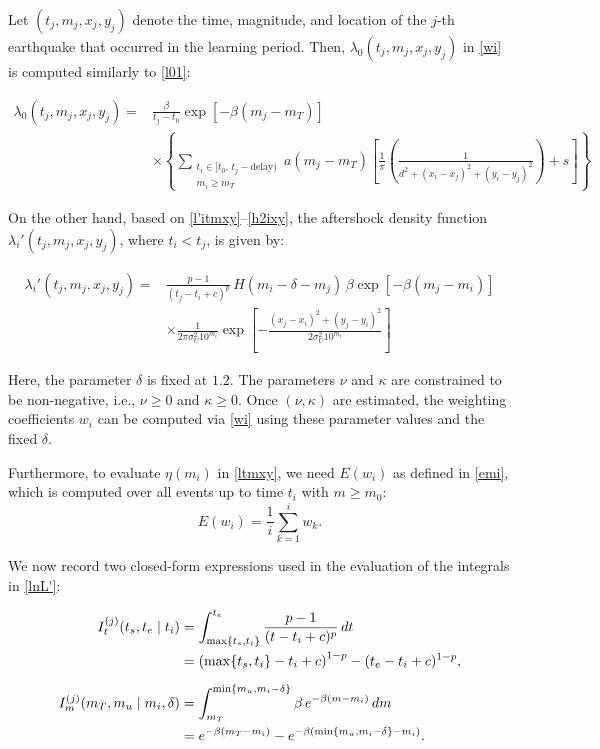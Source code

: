 \documentclass[linenum,doublespace,onecolumn]{SSA-SRL}
\theoremstyle{lemma}
\begin{document}
Let $(t_j, m_j, x_j, y_j)$ denote the time, magnitude, and location of the $j$-th earthquake that occurred in the learning period. Then, $\lambda_0(t_j, m_j, x_j, y_j)$ in \eqref{wi} is computed similarly to \eqref{l01}:

\begin{equation}\label{l20}
\begin{aligned}
\lambda_0(t_j, m_j, x_j, y_j) = &\frac{\beta}{t_j - t_0} \exp\!\left[-\beta(m_j - m_T)\right] \\
&\times \left\{ \sum_{\substack{t_i \in [t_0,\,t_j - \text{delay}) \\ m_i \ge m_T}} 
a(m_j - m_T) \left[ \frac{1}{\pi} \left( \frac{1}{d^2 + (x_i - x_j)^2 + (y_i - y_j)^2} \right) + s \right] \right\}
\end{aligned}
\end{equation}

On the other hand, based on \eqref{l'itmxy}--\eqref{h2ixy}, the aftershock density function $\lambda_i'(t_j, m_j, x_j, y_j)$, where $t_i < t_j$, is given by:

\begin{equation*}
\begin{aligned}
\lambda_i'(t_j, m_j, x_j, y_j) = &\frac{p - 1}{(t_j - t_i + c)^p} \, H(m_i - \delta - m_j)\, \beta \exp\!\left[ -\beta(m_j - m_i) \right] \\
&\times \frac{1}{2\pi \sigma_U^2 10^{m_i}} \exp\!\left[ -\frac{(x_j - x_i)^2 + (y_j - y_i)^2}{2 \sigma_U^2 10^{m_i}} \right]
\end{aligned}
\end{equation*}

Here, the parameter $\delta$ is fixed at $1.2$. The parameters $\nu$ and $\kappa$ are constrained to be non-negative, i.e., $\nu \ge 0$ and $\kappa \ge 0$. Once $(\nu, \kappa)$ are estimated, the weighting coefficients $w_i$ can be computed via \eqref{wi} using these parameter values and the fixed $\delta$.

Furthermore, to evaluate $\eta(m_i)$ in \eqref{ltmxy}, we need $E(w_i)$ as defined in \eqref{emi}, which is computed over all events up to time $t_i$ with $m \ge m_0$:
\begin{equation*}
E(w_i) = \frac{1}{i} \sum_{k = 1}^{i} w_k.
\end{equation*}

We now record two closed-form expressions used in the evaluation of the integrals in \eqref{lnL'}:

\begin{align}
I^{(j)}_t(t_s, t_e \mid t_i) 
&= \int_{\max\{t_s, t_i\}}^{t_e} \frac{p - 1}{(t - t_i + c)^p}\, dt \notag \\
&= \left(\max\{t_s, t_i\} - t_i + c \right)^{1 - p} - (t_e - t_i + c)^{1 - p},
\label{Itj} \\[6pt]
I^{(j)}_m(m_T, m_u \mid m_i, \delta) 
&= \int_{m_T}^{\min\{m_u, m_i - \delta\}} \beta\, e^{-\beta(m - m_i)}\, dm \notag \\
&= e^{-\beta(m_T - m_i)} - e^{-\beta(\min\{m_u, m_i - \delta\} - m_i)}.
\label{Imj}
\end{align}
\end{document}
